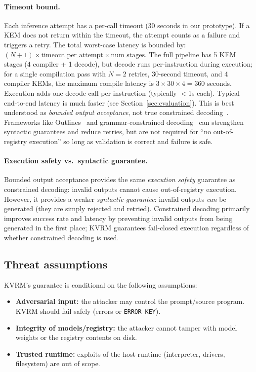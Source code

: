 \documentclass[11pt]{article}
\begin{document}
\paragraph{Timeout bound.}
Each inference attempt has a per-call timeout (30 seconds in our prototype). If a KEM does not return within the timeout, the attempt counts as a failure and triggers a retry. The total worst-case latency is bounded by: $(N+1) \times \mathrm{timeout\_per\_attempt} \times \mathrm{num\_stages}$. The full pipeline has 5 KEM stages (4 compiler + 1 decode), but decode runs per-instruction during execution; for a single compilation pass with $N=2$ retries, 30-second timeout, and 4 compiler KEMs, the maximum compile latency is $3 \times 30 \times 4 = 360$ seconds. Execution adds one decode call per instruction (typically $<$1s each). Typical end-to-end latency is much faster (see Section~\ref{sec:evaluation}).
This is best understood as \emph{bounded output acceptance}, not true constrained decoding~\cite{hokamp2017grid,post2018vdba}.
Frameworks like Outlines~\cite{willard2023outlines} and grammar-constrained decoding~\cite{geng2023gcd} can strengthen syntactic guarantees and reduce retries, but are not required for ``no out-of-registry execution'' so long as validation is correct and failure is safe.

\paragraph{Execution safety vs.\ syntactic guarantee.}
Bounded output acceptance provides the same \emph{execution safety} guarantee as constrained decoding: invalid outputs cannot cause out-of-registry execution.
However, it provides a weaker \emph{syntactic guarantee}: invalid outputs \emph{can} be generated (they are simply rejected and retried).
Constrained decoding primarily improves success rate and latency by preventing invalid outputs from being generated in the first place; KVRM guarantees fail-closed execution regardless of whether constrained decoding is used.

\subsection{Threat assumptions}
KVRM's guarantee is conditional on the following assumptions:
\begin{itemize}[leftmargin=*]
  \item \textbf{Adversarial input:} the attacker may control the prompt/source program. KVRM should fail safely (errors or \texttt{ERROR\_KEY}).
  \item \textbf{Integrity of models/registry:} the attacker cannot tamper with model weights or the registry contents on disk.
  \item \textbf{Trusted runtime:} exploits of the host runtime (interpreter, drivers, filesystem) are out of scope.
\end{itemize}
\end{document}
